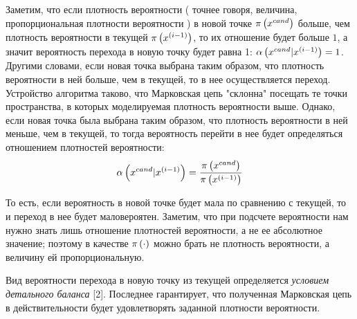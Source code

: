 Заметим, что если плотность вероятности ( точнее говоря, величина, пропорциональная плотности вероятности ) в новой точке $\pi \left( x^{cand} \right)$ больше, чем плотность вероятности в текущей $\pi \left( x^{\left( i - 1 \right)} \right)$, то их отношение будет больше $1$, а значит вероятность перехода в новую точку будет равна 1: $\alpha \left( x^{cand} | x^{(i - 1)} \right) = 1$. Другими словами, если новая точка выбрана таким образом, что плотность вероятности в ней больше, чем в текущей, то в нее осуществляется переход. Устройство алгоритма таково, что Марковская цепь "склонна" посещать те точки пространства, в которых моделируемая плотность вероятности выше. Однако, если новая точка была выбрана таким образом, что плотность вероятности в ней меньше, чем в текущей, то тогда вероятность перейти в нее будет определяться отношением плотностей вероятности:
\begin{gather}
		\alpha \left( x^{cand} | x^{(i - 1)} \right) = \frac{\pi \left( x^{cand} \right)}{\pi \left( x^{(i - 1)} \right)} \notag
\end{gather}

То есть, если вероятность в новой точке будет мала по сравнению с текущей, то и переход в нее будет маловероятен. Заметим, что при подсчете вероятности нам нужно знать лишь отношение плотностей вероятности, а не ее абсолютное значение; поэтому в качестве $\pi \left( \cdot \right)$ можно брать не плотность вероятности, а величину ей пропорциональную. \par
Вид вероятности перехода в новую точку из текущей определяется \textit{условием детального баланса} [2]. Последнее гарантирует, что полученная Марковская цепь в действительности будет удовлетворять заданной плотности вероятности.

